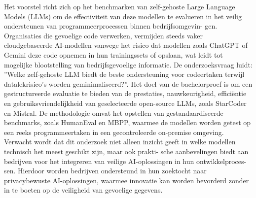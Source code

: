 \documentclass[english,dit,thesis]{hogentreport}
\renewcommand{\cleardoublepage}{\clearpage}
\begin{document}
Het voorstel richt zich op het benchmarken van zelf-gehoste Large Language Models (LLMs) om de effectiviteit
van deze modellen te evalueren in het veilig ondersteunen van programmeerprocessen binnen bedrijfsomgevin-
gen. Organisaties die gevoelige code verwerken, vermijden steeds vaker cloudgebaseerde AI-modellen vanwege
het risico dat modellen zoals ChatGPT of Gemini deze code opnemen in hun trainingssets of opslaan, wat leidt
tot mogelijke blootstelling van bedrijfsgevoelige informatie. De onderzoeksvraag luidt: ”Welke zelf-gehoste LLM
biedt de beste ondersteuning voor codeertaken terwijl datalekrisico’s worden geminimaliseerd?”. Het doel van
de bachelorproef is om een gestructureerde evaluatie te bieden van de prestaties, nauwkeurigheid, efficiëntie
en gebruiksvriendelijkheid van geselecteerde open-source LLMs, zoals StarCoder en Mistral. De methodologie
omvat het opstellen van gestandaardiseerde benchmarks, zoals HumanEval en MBPP, waarmee de modellen
worden getest op een reeks programmeertaken in een gecontroleerde on-premise omgeving. Verwacht wordt
dat dit onderzoek niet alleen inzicht geeft in welke modellen technisch het meest geschikt zijn, maar ook prakti-
sche aanbevelingen biedt aan bedrijven voor het integreren van veilige AI-oplossingen in hun ontwikkelproces-
sen. Hierdoor worden bedrijven ondersteund in hun zoektocht naar privacybewuste AI-oplossingen, waarmee
innovatie kan worden bevorderd zonder in te boeten op de veiligheid van gevoelige gegevens.




%


\backmatter{}

\setlength\bibitemsep{2pt} %
\printbibliography[heading=bibintoc]

\cleardoublepage
{}
{}
\printglossary[type=\acronymtype, title=Glossary, toctitle=Acronyms]
\end{document}
